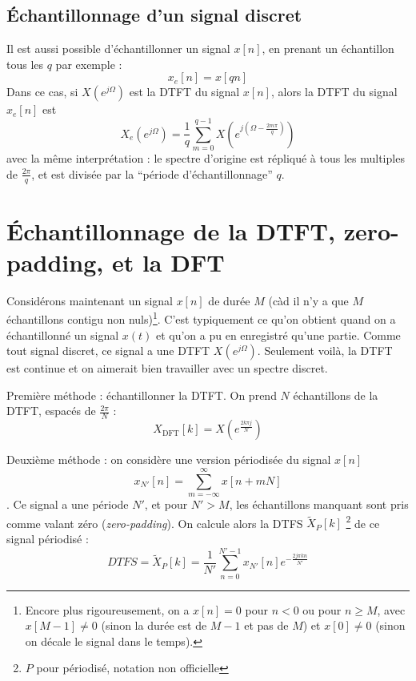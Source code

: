 \documentclass{article}
\begin{document}
\subsection{Échantillonnage d'un signal discret}

Il est aussi possible d'échantillonner un signal $x[n]$, en prenant un échantillon tous les $q$ par exemple :
\[ x_e[n] = x[qn] \]
Dans ce cas, si $X\left(e^{j\Omega}\right)$ est la DTFT du signal $x[n]$, alors la DTFT du signal $x_e[n]$ est
\begin{equation}
X_e\left(e^{j\Omega}\right) = \frac{1}{q} \sum_{m=0}^{q-1} X\left(e^{j(\Omega-\frac{2m\pi}{q})}\right)
\label{eq:sampling_dtft_e_from_dtft}
\end{equation}
avec la même interprétation : le spectre d'origine est répliqué à tous les multiples de $\frac{2\pi}{q}$, et est divisée par la ``période d'échantillonnage'' $q$.

\section{Échantillonnage de la DTFT, zero-padding, et la DFT}

Considérons maintenant un signal $x[n]$ de durée $M$ (càd il n'y a que $M$ échantillons contigu non nuls)\footnote{Encore plus rigoureusement, on a $x[n]=0$ pour $n<0$ ou pour $n\ge M$, avec $x[M-1]\neq 0$ (sinon la durée est de $M-1$ et pas de $M$) et $x[0]\neq 0$ (sinon on décale le signal dans le temps).}. C'est typiquement ce qu'on obtient quand on a échantillonné un signal $x(t)$ et qu'on a pu en enregistré qu'une partie. Comme tout signal discret, ce signal a une DTFT $X\left(e^{j\Omega}\right)$. Seulement voilà, la DTFT est continue et on aimerait bien travailler avec un spectre discret.

Première méthode : échantillonner la DTFT. On prend $N$ échantillons de la DTFT, espacés de $\frac{2\pi}{N}$ :
\begin{equation}
X_\mathrm{DFT}[k] = X\left( e^{\frac{2k\pi j}{N}} \right)
\label{eq:dft_from_dtft}
\end{equation}

Deuxième méthode : on considère une version périodisée du signal $x[n]$
\[ x_{N'}[n] = \sum_{m=-\infty}^{\infty} x[n + mN] \].
Ce signal a une période $N'$, et pour $N'>M$, les échantillons manquant sont pris comme valant zéro (\emph{zero-padding}). On calcule alors la DTFS $\tilde{X}_P[k]$ \footnote{$P$ pour périodisé, notation non officielle} de ce signal périodisé :
\begin{equation}
DTFS = \tilde{X}_P[k] = \frac{1}{N'} \sum_{n=0}^{N'-1} x_{N'}[n] e^{-\frac{2j\pi k n}{N'}}
\label{eq:dtfs_from_x_zero_pad}
\end{equation}
\end{document}
